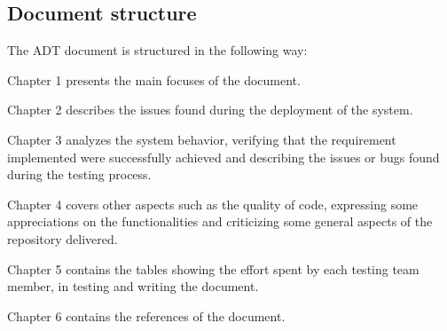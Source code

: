 \subsection{Document structure}
The ADT document is structured in the following way:

\bigskip\noindent
Chapter 1 presents the main focuses of the document.

\bigskip\noindent
Chapter 2 describes the issues found during the deployment of the system.

\bigskip\noindent
Chapter 3 analyzes the system behavior, verifying that the requirement implemented were successfully achieved and describing the issues or bugs found during the testing process.

\bigskip\noindent
Chapter 4 covers other aspects such as the quality of code, expressing some appreciations on the functionalities and criticizing some general aspects of the repository delivered.

\bigskip\noindent
Chapter 5 contains the tables showing the effort spent by each testing team member, in testing and writing the document.

\bigskip\noindent
Chapter 6 contains the references of the document.




